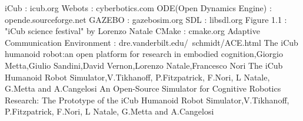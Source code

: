 \documentclass[12pt]{report}
\begin{document}
\begin{thebibliography}{9}
iCub : icub.org
Webots : cyberbotics.com
ODE(Open Dynamics Engine) : opende.sourceforge.net
GAZEBO : gazebosim.org
SDL : libsdl.org
Figure 1.1 : "iCub science festival" by Lorenzo Natale
CMake : cmake.org 
Adaptive Communication Environment : dre.vanderbilt.edu/~schmidt/ACE.html
The iCub humanoid robot:an open platform for research in embodied cognition,Giorgio Metta,Giulio Sandini,David Vernon,Lorenzo Natale,Francesco Nori
The iCub Humanoid Robot Simulator,V.Tikhanoff, P.Fitzpatrick, F.Nori, L Natale, G.Metta and A.Cangelosi
An Open-Source Simulator for Cognitive Robotics Research: The Prototype of the iCub Humanoid Robot Simulator,V.Tikhanoff, P.Fitzpatrick, F.Nori, L Natale, G.Metta and A.Cangelosi
\end{thebibliography}
\newpage
\end{document}
